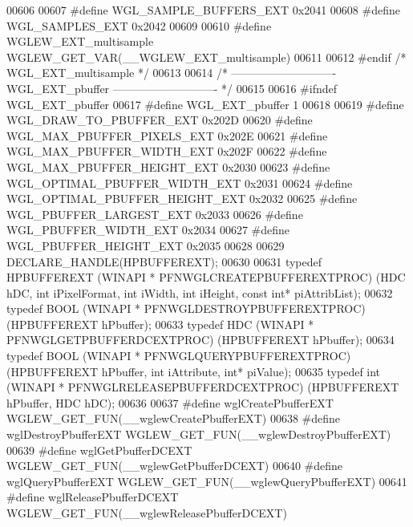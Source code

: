 \begin{DoxyCode}
00606 
00607 \textcolor{preprocessor}{#define WGL\_SAMPLE\_BUFFERS\_EXT 0x2041}
00608 \textcolor{preprocessor}{#define WGL\_SAMPLES\_EXT 0x2042}
00609 
00610 \textcolor{preprocessor}{#define WGLEW\_EXT\_multisample WGLEW\_GET\_VAR(\_\_WGLEW\_EXT\_multisample)}
00611 
00612 \textcolor{preprocessor}{#endif }\textcolor{comment}{/* WGL\_EXT\_multisample */}\textcolor{preprocessor}{}
00613 
00614 \textcolor{comment}{/* ---------------------------- WGL\_EXT\_pbuffer ---------------------------- */}
00615 
00616 \textcolor{preprocessor}{#ifndef WGL\_EXT\_pbuffer}
00617 \textcolor{preprocessor}{#define WGL\_EXT\_pbuffer 1}
00618 
00619 \textcolor{preprocessor}{#define WGL\_DRAW\_TO\_PBUFFER\_EXT 0x202D}
00620 \textcolor{preprocessor}{#define WGL\_MAX\_PBUFFER\_PIXELS\_EXT 0x202E}
00621 \textcolor{preprocessor}{#define WGL\_MAX\_PBUFFER\_WIDTH\_EXT 0x202F}
00622 \textcolor{preprocessor}{#define WGL\_MAX\_PBUFFER\_HEIGHT\_EXT 0x2030}
00623 \textcolor{preprocessor}{#define WGL\_OPTIMAL\_PBUFFER\_WIDTH\_EXT 0x2031}
00624 \textcolor{preprocessor}{#define WGL\_OPTIMAL\_PBUFFER\_HEIGHT\_EXT 0x2032}
00625 \textcolor{preprocessor}{#define WGL\_PBUFFER\_LARGEST\_EXT 0x2033}
00626 \textcolor{preprocessor}{#define WGL\_PBUFFER\_WIDTH\_EXT 0x2034}
00627 \textcolor{preprocessor}{#define WGL\_PBUFFER\_HEIGHT\_EXT 0x2035}
00628 
00629 DECLARE_HANDLE(HPBUFFEREXT);
00630 
00631 \textcolor{keyword}{typedef} HPBUFFEREXT (WINAPI * PFNWGLCREATEPBUFFEREXTPROC) (HDC hDC, \textcolor{keywordtype}{int} 
      iPixelFormat, \textcolor{keywordtype}{int} iWidth, \textcolor{keywordtype}{int} iHeight, \textcolor{keyword}{const} \textcolor{keywordtype}{int}* piAttribList);
00632 \textcolor{keyword}{typedef} BOOL (WINAPI * PFNWGLDESTROYPBUFFEREXTPROC) (HPBUFFEREXT hPbuffer);
00633 \textcolor{keyword}{typedef} HDC (WINAPI * PFNWGLGETPBUFFERDCEXTPROC) (HPBUFFEREXT hPbuffer);
00634 \textcolor{keyword}{typedef} BOOL (WINAPI * PFNWGLQUERYPBUFFEREXTPROC) (HPBUFFEREXT hPbuffer, \textcolor{keywordtype}{int} 
      iAttribute, \textcolor{keywordtype}{int}* piValue);
00635 \textcolor{keyword}{typedef} int (WINAPI * PFNWGLRELEASEPBUFFERDCEXTPROC) (HPBUFFEREXT hPbuffer, HDC 
      hDC);
00636 
00637 \textcolor{preprocessor}{#define wglCreatePbufferEXT WGLEW\_GET\_FUN(\_\_wglewCreatePbufferEXT)}
00638 \textcolor{preprocessor}{#define wglDestroyPbufferEXT WGLEW\_GET\_FUN(\_\_wglewDestroyPbufferEXT)}
00639 \textcolor{preprocessor}{#define wglGetPbufferDCEXT WGLEW\_GET\_FUN(\_\_wglewGetPbufferDCEXT)}
00640 \textcolor{preprocessor}{#define wglQueryPbufferEXT WGLEW\_GET\_FUN(\_\_wglewQueryPbufferEXT)}
00641 \textcolor{preprocessor}{#define wglReleasePbufferDCEXT WGLEW\_GET\_FUN(\_\_wglewReleasePbufferDCEXT)}

\end{DoxyCode}
